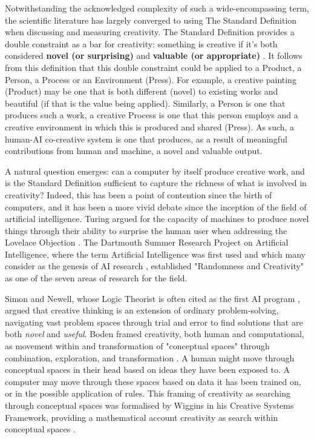Notwithstanding the acknowledged complexity of such a wide-encompassing term, the scientific literature has largely converged to using The Standard Definition when discussing and measuring creativity. The Standard Definition provides a double constraint as a bar for creativity: something is creative if it's both considered \textbf{novel (or surprising)} and \textbf{valuable (or appropriate)} \cite{Amabile1983-lj, Sternberg1998-oz, Runco2012-mk, Boden2003-hk}. It follows from this definition that this double constraint could be applied to a Product, a Person, a Process or an Environment (Press). For example, a creative painting (Product) may be one that is both different (novel) to existing works and beautiful (if that is the value being applied). Similarly, a Person is one that produces such a work, a creative Process is one that this person employs and a creative environment in which this is produced and shared (Press). As such, a human-AI co-creative system is one that produces, as a result of meaningful contributions from human and machine, a novel and valuable output. 

A natural question emerges: can a computer by itself produce creative work, and is the Standard Definition sufficient to capture the richness of what is involved in creativity? Indeed, this has been a point of contention since the birth of computers, and it has been a more vivid debate since the inception of the field of artificial intelligence. Turing argued for the capacity of machines to produce novel things through their ability to surprise the human user when addressing the Lovelace Objection \cite{Turing1950-aq}. The Dartmouth Summer Research Project on Artificial Intelligence, where the term Artificial Intelligence was first used and which many consider as the genesis of AI research \cite{McCarthy1955-ls}, established "Randomness and Creativity" as one of the seven areas of research for the field. 

Simon and Newell, whose Logic Theorist is often cited as the first AI program \cite{Russell2016-oe}, argued that creative thinking is an extension of ordinary problem‑solving, navigating vast problem spaces through trial and error to find solutions that are both \textit{novel} and \textit{useful}\cite{Simon1967-nr}. Boden framed creativity, both human and computational, as movement within and transformation of "conceptual spaces" through combination, exploration, and transformation \cite{Boden2003-hk}. A human might move through conceptual spaces in their head based on ideas they have been exposed to. A computer may move through these spaces based on data it has been trained on, or in the possible application of rules. This framing of creativity as searching through conceptual spaces was formalised by Wiggins in his Creative Systems Framework, providing a mathematical account creativity as search within conceptual spaces  \cite{Wiggins2006-zd}.

